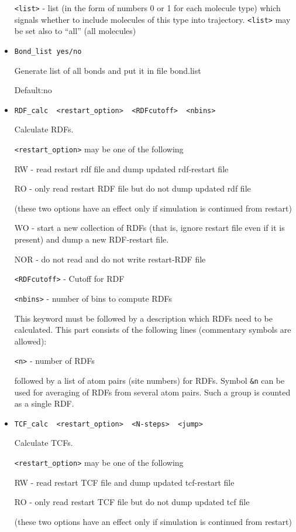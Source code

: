 \documentclass{article}
\begin{document}
\begin{itemize}
\verb|<list>| - list (in the form of numbers 0 or 1 for each molecule type) 
which signals whether to include molecules of this type into trajectory.
\verb|<list>| may be set also to ``all'' (all molecules)   

\item
\verb|Bond_list yes/no|

Generate list of all bonds and put it in file bond.list

Default:no

\item
\verb|RDF_calc  <restart_option>  <RDFcutoff>  <nbins>|

Calculate RDFs.

\verb|<restart_option>| may be one of the following

RW   - read restart rdf file and dump updated rdf-restart file

RO   - only read restart RDF file but do not dump updated rdf file

(these two options have an effect only if simulation is continued from restart)

WO   - start a new collection of RDFs (that is, ignore restart file even 
if it is present) and dump a new RDF-restart file.

NOR  - do not read and do not write restart-RDF file

\verb|<RDFcutoff>| - Cutoff for RDF

\verb|<nbins>| - number of bins to compute RDFs


This keyword must be followed by a description which RDFs need to be
calculated. This part consists of the following lines (commentary symbols
are allowed):

\verb|<n>|  - number of RDFs

followed by a list of atom pairs (site numbers) for RDFs. Symbol \verb|&n|
can be used for averaging of RDFs from several atom pairs. Such a group
is counted as a single RDF.


\item
\verb|TCF_calc  <restart_option>  <N-steps>  <jump>|

Calculate TCFs.

\verb|<restart_option>| may be one of the following

RW   - read restart TCF file and dump updated tcf-restart file

RO   - only read restart TCF file but do not dump updated tcf file

(these two options have an effect only if simulation is continued from restart)


\end{itemize}
\end{document}
